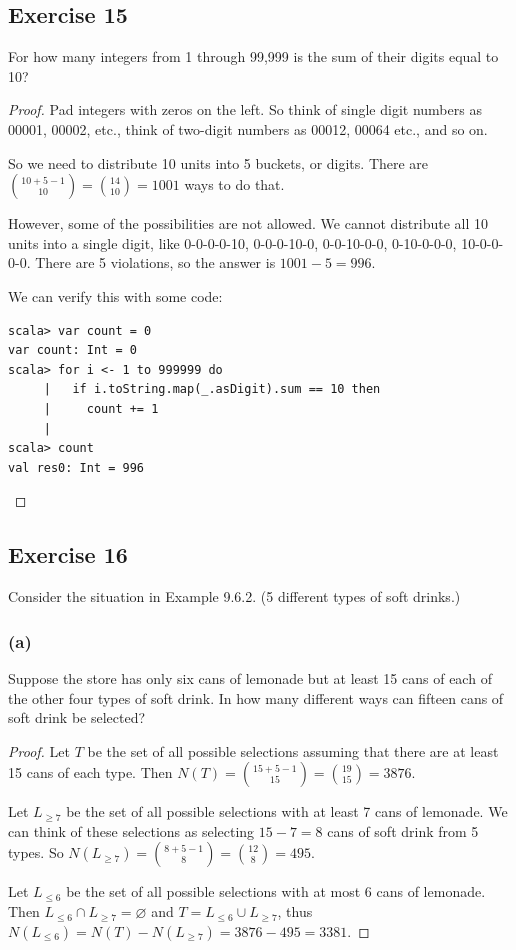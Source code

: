 \documentclass[14pt]{extarticle}
\newcommand{\es}{\varnothing}
\begin{document}
\subsection{Exercise 15}
For how many integers from 1 through 99,999 is the sum of their digits equal to 10?

\begin{proof}
Pad integers with zeros on the left. So think of single digit numbers as 00001, 00002, etc., think of two-digit numbers as 
00012, 00064 etc., and so on.

So we need to distribute 10 units into 5 buckets, or digits. There are \(\binom{10+5-1}{10} = \binom{14}{10} = 1001\) ways 
to do that.

However, some of the possibilities are not allowed. We cannot distribute all 10 units into a single digit, like 0-0-0-0-10,
0-0-0-10-0, 0-0-10-0-0, 0-10-0-0-0, 10-0-0-0-0. There are 5 violations, so the answer is \(1001-5 = 996\).

We can verify this with some code:
\begin{verbatim}
scala> var count = 0
var count: Int = 0
scala> for i <- 1 to 999999 do
     |   if i.toString.map(_.asDigit).sum == 10 then
     |     count += 1
     | 
scala> count
val res0: Int = 996
\end{verbatim}
\end{proof}

\subsection{Exercise 16}
Consider the situation in Example 9.6.2. (5 different types of soft drinks.)

\subsubsection{(a)}
Suppose the store has only six cans of lemonade but at least 15 cans of each of the other four types of soft drink. In how 
many different ways can fifteen cans of soft drink be selected?

\begin{proof}
Let \(T\) be the set of all possible selections assuming that there are at least 15 cans of each type. Then \(N(T) = 
\binom{15+5-1}{15} = \binom{19}{15} = 3876\).

Let \(L_{\geq 7}\) be the set of all possible selections with at least 7 cans of lemonade. We can think of these selections
as selecting \(15-7=8\) cans of soft drink from 5 types. So \(N(L_{\geq 7}) = \binom{8+5-1}{8} = \binom{12}{8} = 495\).

Let \(L_{\leq 6}\) be the set of all possible selections with at most 6 cans of lemonade. Then \(L_{\leq 6} \cap L_{\geq 7} 
= \es\) and \(T = L_{\leq 6} \cup L_{\geq 7}\), thus \(N(L_{\leq 6}) = N(T) - N(L_{\geq 7}) = 3876 - 495 = 3381\).
\end{proof}
\end{document}
